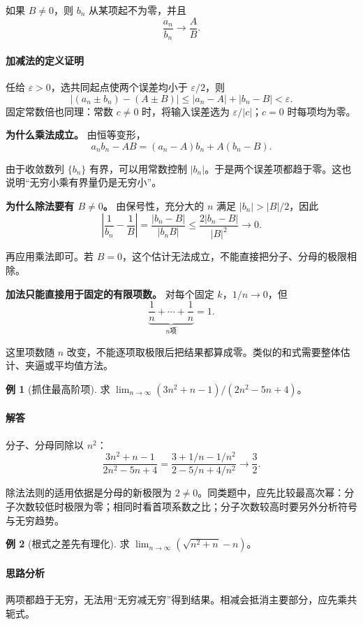 \documentclass[UTF8,fontset=fandol,12pt,oneside,openany]{ctexrep}
\theoremstyle{definition}
\newtheorem{example}{例}[chapter]
\begin{document}
如果 $B\ne0$，则 $b_n$ 从某项起不为零，并且
\[
\frac{a_n}{b_n}\to\frac AB.
\]

\paragraph{加减法的定义证明} 任给 $\varepsilon>0$，选共同起点使两个误差均小于 $\varepsilon/2$，则
\[
|(a_n\pm b_n)-(A\pm B)|
\le|a_n-A|+|b_n-B|<\varepsilon.
\]
固定常数倍也同理：常数 $c\ne0$ 时，将输入误差选为 $\varepsilon/|c|$；$c=0$ 时每项均为零。

\textbf{为什么乘法成立。} 由恒等变形，
\[
a_nb_n-AB=(a_n-A)b_n+A(b_n-B).
\]

由于收敛数列 $\{b_n\}$ 有界，可以用常数控制 $|b_n|$。于是两个误差项都趋于零。这也说明“无穷小乘有界量仍是无穷小”。

\textbf{为什么除法要有 $B\ne0$。} 由保号性，充分大的 $n$ 满足 $|b_n|>|B|/2$，因此
\[
\left|\frac1{b_n}-\frac1B\right|
=\frac{|b_n-B|}{|b_nB|}
\le\frac{2|b_n-B|}{|B|^2}\to0.
\]

再应用乘法即可。若 $B=0$，这个估计无法成立，不能直接把分子、分母的极限相除。

\textbf{加法只能直接用于固定的有限项数。} 对每个固定 $k$，$1/n\to0$，但
\[
\underbrace{\frac1n+\cdots+\frac1n}_{n\text{项}}=1.
\]

这里项数随 $n$ 改变，不能逐项取极限后把结果都算成零。类似的和式需要整体估计、夹逼或平均值方法。

\begin{example}[抓住最高阶项]
求 $\lim_{n\to\infty}(3n^2+n-1)/(2n^2-5n+4)$。
\end{example}

\paragraph{解答} 分子、分母同除以 $n^2$：
\[
\frac{3n^2+n-1}{2n^2-5n+4}
=\frac{3+1/n-1/n^2}{2-5/n+4/n^2}\to\frac32.
\]

除法法则的适用依据是分母的新极限为 $2\ne0$。同类题中，应先比较最高次幂：分子次数较低时极限为零；相同时看首项系数之比；分子次数较高时要另外分析符号与无穷趋势。

\begin{example}[根式之差先有理化]
求 $\lim_{n\to\infty}(\sqrt{n^2+n}-n)$。
\end{example}

\paragraph{思路分析} 两项都趋于无穷，无法用“无穷减无穷”得到结果。相减会抵消主要部分，应先乘共轭式。
\end{document}
